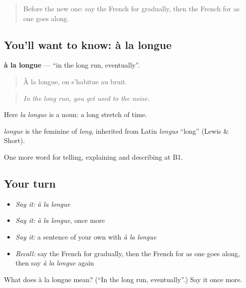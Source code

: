\label{lesson:FR-C271-a-la-longue}



\begin{quote}
Before the new one: say the French for gradually, then the French for as one goes along.
\end{quote}

\subsection*{You'll want to know: à la longue}
\textbf{à la longue} — \textquotedblleft{}in the long run, eventually\textquotedblright{}.

\begin{quote}
À la longue, on s'habitue au bruit.
\end{quote}

\begin{quote}
\emph{In the long run, you get used to the noise.}
\end{quote}

Here \emph{la longue} is a noun: a long stretch of time.

\begin{cousinweb}
\emph{longue} is the feminine of \emph{long}, inherited from Latin \emph{longus} \textquotedblleft{}long\textquotedblright{} (Lewis \& Short).
\end{cousinweb}

\begin{grammarlens}[title={What you've built}]
One more word for telling, explaining and describing at B1.
\end{grammarlens}

\subsection*{Your turn}
\begin{itemize}
\raggedright
  \item \emph{Say it:} \emph{à la longue}
  \item \emph{Say it:} \emph{à la longue}, once more
  \item \emph{Say it:} a sentence of your own with \emph{à la longue}
  \item \emph{Recall:} say the French for gradually, then the French for as one goes along, then say \emph{à la longue} again
\end{itemize}

\begin{tcolorbox}[breakable,colback=teal!4,colframe=teal!35!black,title={Before you move on}]
What does à la longue mean? (\textquotedblleft{}In the long run, eventually\textquotedblright{}.) Say it once more.
\end{tcolorbox}
